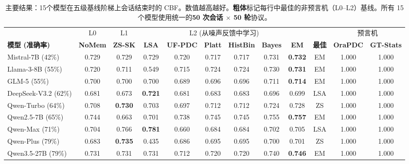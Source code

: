 \documentclass[11pt,a4paper,fontset=fandol]{ctexart}
\begin{document}
\begin{table}[t]
\centering
\caption{主要结果：15个模型在五级基线阶梯上会话结束时的 CBF。数值越高越好。\textbf{粗体}标记每行中最佳的非预言机（L0--L2）基线。所有 15 个模型使用统一的\textbf{50 次会话 $\times$ 50 轮}协议。}
\label{tab:main}
\vspace{0.5em}
\footnotesize
\setlength{\tabcolsep}{3pt}
\begin{tabular}{@{}l c c c c c c c c c | c c@{}}
\toprule
& \multicolumn{1}{c}{L0} & \multicolumn{1}{c}{L1} & \multicolumn{6}{c}{L2 (从噪声反馈中学习)} & & \multicolumn{2}{c}{预言机} \\
\cmidrule(lr){2-2} \cmidrule(lr){3-3} \cmidrule(lr){4-9}\cmidrule(lr){11-12}
\textbf{模型 (准确率)} & \textbf{NoMem} & \textbf{ZS-SK} & \textbf{LSA} & \textbf{UF-PDC} & \textbf{Platt} & \textbf{HistBin} & \textbf{Bayes} & \textbf{EM} & \textbf{最佳} & \textbf{OraPDC} & \textbf{GT-Stats} \\
\midrule
Mistral-7B (42\%) & 0.729 & 0.729 & 0.729 & 0.720 & 0.717 & 0.717 & 0.731 & \textbf{0.732} &    EM & 1.000 & 1.000 \\
Llama-3-8B (55\%) & 0.720 & 0.711 & 0.549 & 0.715 & 0.724 & 0.724 & 0.730 & \textbf{0.731} &    EM & 1.000 & 1.000 \\
GLM-5 (55\%) & 0.700 & 0.700 & 0.700 & 0.689 & 0.696 & 0.696 & 0.711 & \textbf{0.714} &    EM & 1.000 & 1.000 \\
DeepSeek-V3.2 (62\%) & 0.681 & 0.673 & \textbf{0.721} & 0.681 & 0.683 & 0.683 & 0.696 & 0.699 &   LSA & 1.000 & 1.000 \\
Qwen-Turbo (64\%) & 0.708 & \textbf{0.730} & 0.703 & 0.697 & 0.712 & 0.712 & 0.724 & 0.728 &    ZS & 1.000 & 1.000 \\
Qwen2.5-7B (65\%) & 0.744 & 0.663 & 0.701 & 0.738 & 0.745 & 0.745 & 0.755 & \textbf{0.757} &    EM & 1.000 & 1.000 \\
Qwen-Max (71\%) & 0.704 & 0.766 & \textbf{0.781} & 0.660 & 0.684 & 0.684 & 0.702 & 0.705 &   LSA & 1.000 & 1.000 \\
Qwen-Plus (79\%) & 0.683 & \textbf{0.735} & 0.435 & 0.686 & 0.695 & 0.695 & 0.700 & 0.701 &    ZS & 1.000 & 1.000 \\
Qwen3.5-27B (79\%) & 0.731 & 0.731 & 0.731 & 0.712 & 0.720 & 0.720 & 0.740 & \textbf{0.746} &    EM & 1.000 & 1.000 \\

\end{tabular}
\end{table}
\end{document}
